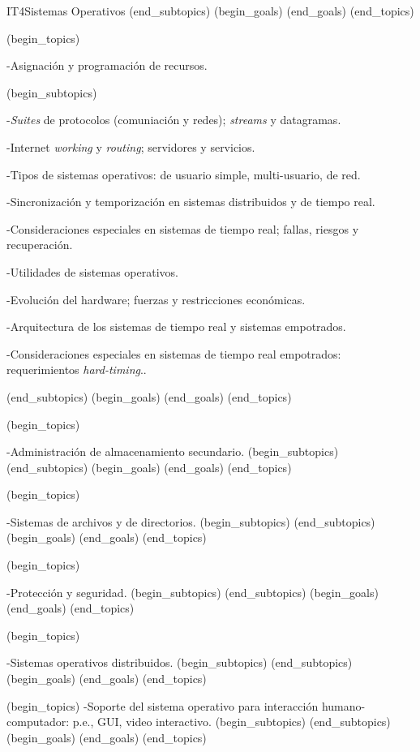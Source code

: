 \begin{BKL2}{IT4}{Sistemas Operativos}
(end_subtopics)
(begin_goals)
(end_goals)
(end_topics)

 

(begin_topics)

-Asignación y programación de recursos.

(begin_subtopics)

-\textit{Suites} de protocolos (comuniación y redes); \textit{streams} y datagramas.

-Internet \textit{working} y \textit{routing}; servidores y servicios.

-Tipos de sistemas operativos: de usuario simple, multi-usuario, de red.

-Sincronización y temporización en sistemas distribuidos y de tiempo real.

-Consideraciones especiales en sistemas de tiempo real; fallas, riesgos y recuperación.

-Utilidades de sistemas operativos.

-Evolución del hardware; fuerzas y restricciones económicas.

-Arquitectura de los sistemas de tiempo real y sistemas empotrados.

-Consideraciones especiales en sistemas de tiempo real empotrados: requerimientos \textit{hard-timing}..

(end_subtopics)
(begin_goals)
(end_goals)
(end_topics)

 

(begin_topics)

-Administración de almacenamiento secundario.
(begin_subtopics)
(end_subtopics)
(begin_goals)
(end_goals)
(end_topics)

 

(begin_topics)

-Sistemas de archivos y de directorios.
(begin_subtopics)
(end_subtopics)
(begin_goals)
(end_goals)
(end_topics)

 

(begin_topics)

-Protección y seguridad.
(begin_subtopics)
(end_subtopics)
(begin_goals)
(end_goals)
(end_topics)

 

(begin_topics)

-Sistemas operativos distribuidos.
(begin_subtopics)
(end_subtopics)
(begin_goals)
(end_goals)
(end_topics)

 

(begin_topics)
-Soporte del sistema operativo para interacción humano-computador: p.e., GUI, video interactivo.
(begin_subtopics)
(end_subtopics)
(begin_goals)
(end_goals)
(end_topics)


\end{BKL2}
